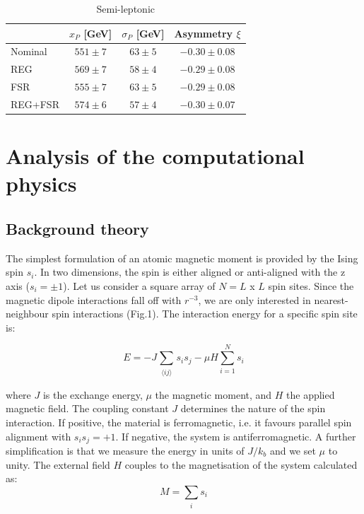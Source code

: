 \documentclass[a4paper]{article}
\begin{document}
\pagebreak



\begin{table}
\centering
\begin{tabular}{l|c|c|c}
\hline
 &  $x_P$ [GeV] &  $\sigma_P$ [GeV] & Asymmetry $\xi$ \\
\hline
Nominal     & $551 \pm 7$       & $63 \pm 5$           & $-0.30 \pm 0.08$  \\                    
REG         & $569 \pm 7$       & $58 \pm 4$           & $-0.29 \pm 0.08$  \\                   
FSR         & $555 \pm 7$       & $63 \pm 5$           & $-0.29 \pm 0.08$  \\                 
REG+FSR     & $574 \pm 6$       & $57 \pm 4$           & $-0.30 \pm 0.07$  \\
               
\hline
\end{tabular}
\caption{ Semi-leptonic }
\end{table}
\vspace{0.1cm}


\pagebreak

\section{Analysis of the computational physics}

\subsection{Background theory}

The simplest formulation of an atomic magnetic moment is provided by the Ising spin $s_i$. In two dimensions, the spin is either aligned or anti-aligned with the z axis ($s_i = \pm 1$). Let us consider a square array of $N = L$ x $L$ spin sites. Since the magnetic dipole interactions fall off with $r^{-3}$, we are only interested in nearest-neighbour spin interactions (Fig.1). The interaction energy for a specific spin site is:

\begin{equation}
E = -J \sum_{\substack{ \langle ij \rangle}}s_i s_j -\mu H \sum\limits_{i = 1}^N s_i
\end{equation}



where $J$ is the exchange energy, $\mu$ the magnetic moment, and $H$ the applied magnetic field. The coupling constant $J$ determines the nature of the spin interaction. If positive, the material is ferromagnetic, i.e. it favours parallel spin alignment with $s_i s_j = +1$. If negative, the system is antiferromagnetic. A further simplification is that we measure the energy in units of $J/k_b$ and we set $\mu$ to unity. The external field $H$ couples to the magnetisation of the system calculated as:
\begin{equation}
M =  \sum_{\substack{i}}s_i
\end{equation}
\end{document}
